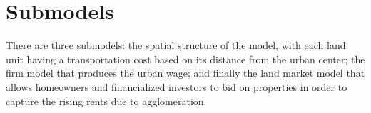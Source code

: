 \section{Submodels}
There are three submodels: the spatial structure of the model, with each land unit having a transportation cost based on its distance from the urban center; the firm model that produces the urban wage; and finally the land market model that allows homeowners and financialized investors to bid on properties in order to capture the rising rents due to agglomeration.  





